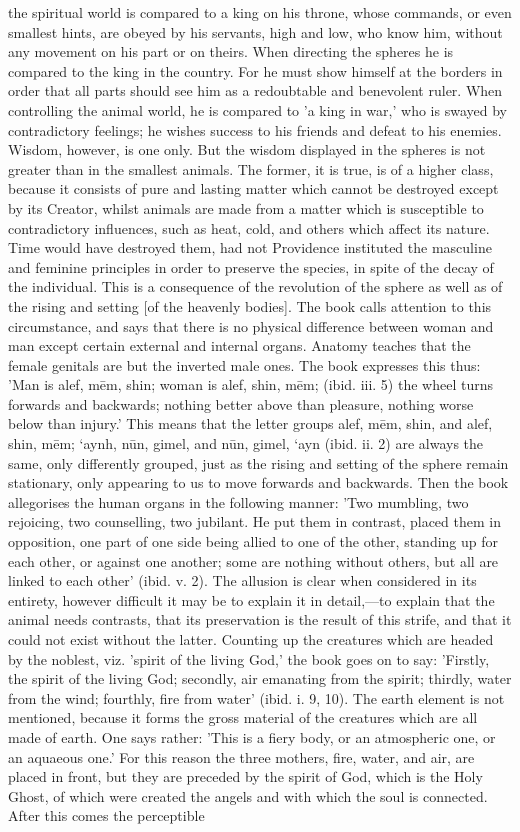 \documentclass[12pt]{article}
\begin{document}
the spiritual world is compared to a king on his throne, whose commands, or even smallest hints, are obeyed by his servants, high and low, who know him, without any movement on his part or on theirs. When directing the spheres he is compared to the king in the country. For he must show himself at the borders in order that all parts should see him as a redoubtable and benevolent ruler. When controlling the animal world, he is compared to 'a king in war,' who is swayed by contradictory feelings; he wishes success to his friends and defeat to his enemies. Wisdom, however, is one only. But the wisdom displayed in the spheres is not greater than in the smallest animals. The former, it is true, is of a higher class, because it consists of pure and lasting matter which cannot be destroyed except by its Creator, whilst animals are made from a matter which is susceptible to contradictory influences, such as heat, cold, and others which affect its nature. Time would have destroyed them, had not Providence instituted the masculine and feminine principles in order to preserve the species, in spite of the decay of the individual. This is a consequence of the revolution of the sphere as well as of the rising and setting [of the heavenly bodies]. The book calls attention to this circumstance, and says that there is no physical difference between woman and man except certain external and internal organs. Anatomy teaches that the female genitals are but the inverted male ones. The book expresses this thus: 'Man is alef, mēm, shin; woman is alef, shin, mēm; (ibid. iii. 5) the wheel turns forwards and backwards; nothing better above than pleasure, nothing worse below than injury.' This means that the letter groups alef, mēm, shin, and alef, shin, mēm; ‘aynh, nūn, gimel, and nūn, gimel, ‘ayn (ibid. ii. 2) are always the same, only differently grouped, just as the rising and setting of the sphere remain stationary, only appearing to us to move forwards and backwards. Then the book allegorises the human organs in the following manner: 'Two mumbling, two rejoicing, two counselling, two jubilant. He put them in contrast, placed them in opposition, one part of one side being allied to one of the other, standing up for each other, or against one another; some are nothing without others, but all are linked to each other' (ibid. v. 2). The allusion is clear when considered in its entirety, however difficult it may be to explain it in detail,---to explain that the animal needs contrasts, that its preservation is the result of this strife, and that it could not exist without the latter. Counting up the creatures which are headed by the noblest, viz. 'spirit of the living God,' the book goes on to say: 'Firstly, the spirit of the living God; secondly, air emanating from the spirit; thirdly, water from the wind; fourthly, fire from water' (ibid. i. 9, 10). The earth element is not mentioned, because it forms the gross material of the creatures which are all made of earth. One says rather: 'This is a fiery body, or an atmospheric one, or an aquaeous one.' For this reason the three mothers, fire, water, and air, are placed in front, but they are preceded by the spirit of God, which is the Holy Ghost, of which were created the angels and with which the soul is connected. After this comes the perceptible 
\end{document}
